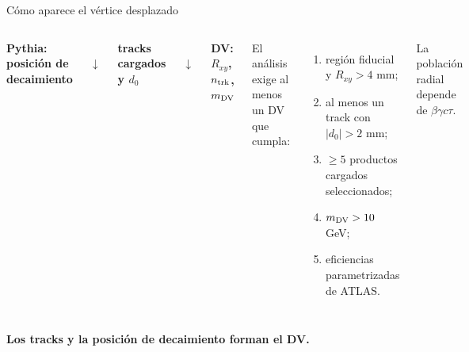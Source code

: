 \documentclass[aspectratio=169,10pt]{beamer}
\newcommand{\pill}[1]{\colorbox{softblue}{\strut\textcolor{deepblue}{\textbf{#1}}}}
\begin{document}
\begin{frame}{Cómo aparece el vértice desplazado}
  \begin{columns}[T]
      \centering\vspace{0.6em}
      \pill{Pythia: posición de decaimiento}\\[1.0em]
      $\downarrow$\\[0.8em]
      \pill{tracks cargados y $d_0$}\\[1.0em]
      $\downarrow$\\[0.8em]
      \pill{DV: $R_{xy}$, $n_{\rm trk}$, $m_{\rm DV}$}
      El análisis exige al menos un DV que cumpla:
      \begin{enumerate}
        \item región fiducial y $R_{xy}>4$ mm;
        \item al menos un track con $|d_0|>2$ mm;
        \item $\geq5$ productos cargados seleccionados;
        \item $m_{\rm DV}>10$ GeV;
        \item eficiencias parametrizadas de ATLAS.
      \end{enumerate}
      La población radial depende de $\beta\gamma c\tau$.
  \end{columns}
  \vfill
  \centering\textbf{Los tracks y la posición de decaimiento forman el DV.}
\end{frame}
\end{document}
